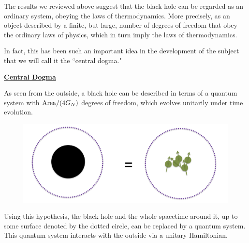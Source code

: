 
The results  we reviewed above suggest that the black hole can be regarded as an ordinary system, obeying the laws of thermodynamics. More precisely, as an object 
  described by a finite, but large, number of degrees of freedom that obey the ordinary laws of physics, which in turn imply the laws of thermodynamics. 
   

In fact, this has been such an important idea in the development of the subject that we will call it the ``central dogma."   \begin{center}
{ \color{red} \underline{\bf%
 Central Dogma}}
\end{center}

 
{\center \begin{framed}   As seen from the outside, a black hole can be described in terms of a quantum system with  $  {\rm Area}/(4G_N ) $  degrees of freedom,   which evolves unitarily under time evolution. 
\end{framed}}
\begin{figure}[h]
\begin{center}
\includegraphics[scale=.3]{figures/BHQuantumBdy.png}
\label{BHQuantumBdy}
\end{center}
\end{figure}
Using this hypothesis, the black hole and the whole spacetime around it, up to some surface denoted by the dotted circle, can be replaced by a quantum system. This quantum system interacts with the outside via a unitary Hamiltonian. 

